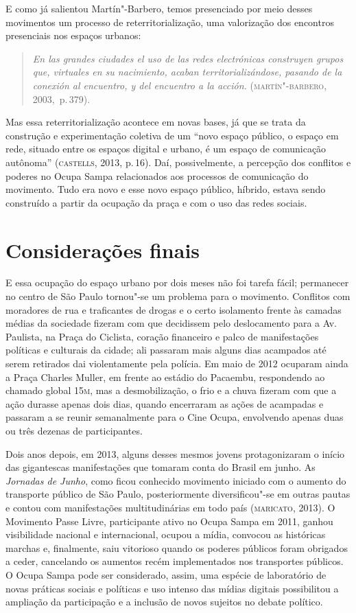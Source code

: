 E como já salientou Martín"-Barbero, temos presenciado por meio desses
movimentos um processo de reterritorialização, uma valorização dos
encontros presenciais nos espaços urbanos:

\begin{quote}
\textit{En las grandes ciudades el uso de las redes electrónicas
construyen grupos que, virtuales en su nacimiento, acaban
territorializándose, pasando de la conexión al encuentro, y del
encuentro a la acción.} (\textsc{martín"-barbero}, 2003,~p.\,379).
\end{quote}

Mas essa reterritorialização acontece em novas bases, já que se trata da
construção e experimentação coletiva de um ``novo espaço público, o
espaço em rede, situado entre os espaços digital e urbano, é um espaço
de comunicação autônoma'' (\textsc{castells}, 2013, p.\,16). Daí, possivelmente, a
percepção dos conflitos e poderes no Ocupa Sampa relacionados aos
processos de comunicação do movimento. Tudo era novo e esse novo espaço
público, híbrido, estava sendo construído a partir da ocupação da praça
e com o uso das redes sociais.

\section{Considerações finais}

E essa ocupação do espaço urbano por dois meses não foi tarefa fácil;
permanecer no centro de São Paulo tornou"-se um problema para o
movimento. Conflitos com moradores de rua e traficantes de drogas e o
certo isolamento frente às camadas médias da sociedade fizeram com que
decidissem pelo deslocamento para a Av.\,Paulista, na Praça do Ciclista,
coração financeiro e palco de manifestações políticas e culturais da
cidade; ali passaram mais alguns dias acampados até serem retirados dai
violentamente pela polícia. Em maio de 2012 ocuparam ainda a Praça
Charles Muller, em frente ao estádio do Pacaembu, respondendo ao chamado
global \textsc{15m}, mas a desmobilização, o frio e a chuva fizeram com que a
ação durasse apenas dois dias, quando encerraram as ações de acampadas e
passaram a se reunir semanalmente para o Cine Ocupa, envolvendo apenas
duas ou três dezenas de participantes.

Dois anos depois, em 2013, alguns desses mesmos jovens
protagonizaram o início das gigantescas manifestações que tomaram conta
do Brasil em junho. As \textit{Jornadas de Junho}, como ficou conhecido
movimento iniciado com o aumento do transporte público de São Paulo,
posteriormente diversificou"-se em outras pautas e contou com
manifestações multitudinárias em todo país (\textsc{maricato}, 2013). O Movimento
Passe Livre, participante ativo no Ocupa Sampa em 2011, ganhou
visibilidade nacional e internacional, ocupou a mídia, convocou as
históricas marchas e, finalmente, saiu vitorioso quando os poderes
públicos foram obrigados a ceder, cancelando os aumentos recém
implementados nos transportes públicos. O Ocupa Sampa pode ser
considerado, assim, uma espécie de laboratório de novas práticas sociais
e políticas e uso intenso das mídias digitais possibilitou a ampliação
da participação e a inclusão de novos sujeitos no debate político.

